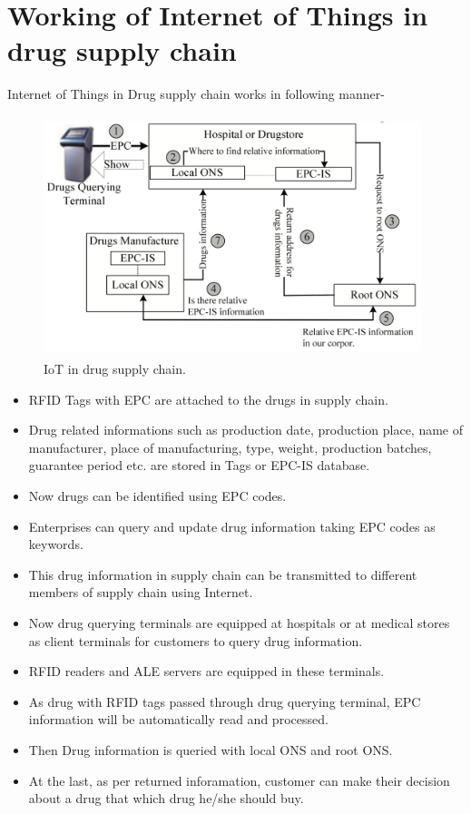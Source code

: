 \documentclass[12pt, a4paper]{report}
\begin{document}
\section{Working of Internet of Things in drug supply chain}
Internet of Things in Drug supply chain works in following manner-
\begin{figure}[h]
\centering
\includegraphics[width=11cm,height=7cm]{drug}			%
\caption{IoT in drug supply chain.\cite{yan2009supply}}
\label{figure-8}
\end{figure}

\begin{itemize}
    \item RFID Tags with EPC are attached to the drugs in supply chain.
    \item Drug related informations such as production date, production place, name of manufacturer, place of manufacturing, type, weight, production batches, guarantee period etc. are stored in Tags or EPC-IS database.
    \item Now drugs can be identified using EPC codes.
    \item Enterprises can query and update drug information taking EPC codes as keywords.
    \item This drug information in supply chain can be transmitted to different members of supply chain using Internet.
    \item Now drug querying terminals are equipped at hospitals or at medical stores as client terminals for customers to query drug information.
    \item RFID readers and ALE servers are equipped in these terminals.
    \item As drug with RFID tags passed through drug querying terminal, EPC information will be automatically read and processed.
    \item Then Drug information is queried with local ONS and root ONS.
    \item At the last, as per returned inforamation, customer can make their decision about a drug that which drug he/she should buy.
    
    
    
\end{itemize}
\end{document}
